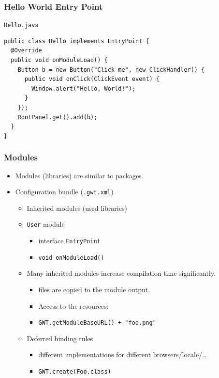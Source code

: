 \documentclass[10pt,table, xcolor=pdflatex]{beamer}
\begin{document}
\begin{frame}[fragile]\frametitle{Hello World Entry Point}
\texttt{Hello.java}
	\lstset{language=Java, basicstyle=\footnotesize\ttfamily}
    \begin{lstlisting}
public class Hello implements EntryPoint {
  @Override
  public void onModuleLoad() {
    Button b = new Button("Click me", new ClickHandler() {
      public void onClick(ClickEvent event) {
        Window.alert("Hello, World!");
      }
    });
    RootPanel.get().add(b);
  }
}
	\end{lstlisting}
\end{frame}


\begin{frame}\frametitle{Modules}
	\begin{itemize}
      \item Modules (libraries) are similar to packages.
	  \item Configuration bundle (\texttt{.gwt.xml})
        \begin{itemize}
        	\item Inherited modules (used libraries)
            \item \texttt{User} module
              \begin{itemize}
            	\item interface \texttt{EntryPoint}
                \item \texttt{void onModuleLoad()}
              \end{itemize}
            \item Many inherited modules increase compilation time significantly.
              \begin{itemize}
                \item files are copied to the module output.
                \item Access to the resources:
            	\item[] \texttt{GWT.getModuleBaseURL() + "foo.png"}
              \end{itemize}
            \item Deferred binding rules
              \begin{itemize}
            	\item different implementations for different browsers/locale/\ldots
                \item \texttt{GWT.create(Foo.class)}
              \end{itemize}
        \end{itemize}
	\end{itemize}
\end{frame}
\end{document}
